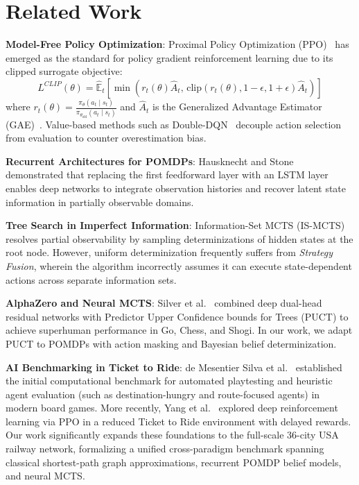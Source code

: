\documentclass[conference,10pt]{IEEEtran}
\begin{document}
\section{Related Work}
\label{sec:related}
\textbf{Model-Free Policy Optimization}: Proximal Policy Optimization (PPO)~\cite{schulman2017proximal} has emerged as the standard for policy gradient reinforcement learning due to its clipped surrogate objective:
\begin{equation}
L^{CLIP}(\theta) = \hat{\mathbb{E}}_t \left[ \min\left(r_t(\theta)\hat{A}_t, \, \text{clip}(r_t(\theta), 1-\epsilon, 1+\epsilon)\hat{A}_t\right) \right]
\end{equation}
where $r_t(\theta) = \frac{\pi_\theta(a_t \mid s_t)}{\pi_{\theta_{\text{old}}}(a_t \mid s_t)}$ and $\hat{A}_t$ is the Generalized Advantage Estimator (GAE)~\cite{schulman2015high}. Value-based methods such as Double-DQN~\cite{mnih2015human, vanhasselt2016deep} decouple action selection from evaluation to counter overestimation bias.

\textbf{Recurrent Architectures for POMDPs}: Hausknecht and Stone~\cite{hausknecht2015deep} demonstrated that replacing the first feedforward layer with an LSTM layer enables deep networks to integrate observation histories and recover latent state information in partially observable domains.

\textbf{Tree Search in Imperfect Information}: Information-Set MCTS (IS-MCTS)~\cite{cowling2012information} resolves partial observability by sampling determinizations of hidden states at the root node. However, uniform determinization frequently suffers from \textit{Strategy Fusion}, wherein the algorithm incorrectly assumes it can execute state-dependent actions across separate information sets.

\textbf{AlphaZero and Neural MCTS}: Silver et al.~\cite{silver2017mastering, silver2018general} combined deep dual-head residual networks with Predictor Upper Confidence bounds for Trees (PUCT) to achieve superhuman performance in Go, Chess, and Shogi. In our work, we adapt PUCT to POMDPs with action masking and Bayesian belief determinization.

\textbf{AI Benchmarking in Ticket to Ride}: de Mesentier Silva et al.~\cite{silva2017playtesting} established the initial computational benchmark for automated playtesting and heuristic agent evaluation (such as destination-hungry and route-focused agents) in modern board games. More recently, Yang et al.~\cite{yang2023reinforcement} explored deep reinforcement learning via PPO in a reduced Ticket to Ride environment with delayed rewards. Our work significantly expands these foundations to the full-scale 36-city USA railway network, formalizing a unified cross-paradigm benchmark spanning classical shortest-path graph approximations, recurrent POMDP belief models, and neural MCTS.
\end{document}
